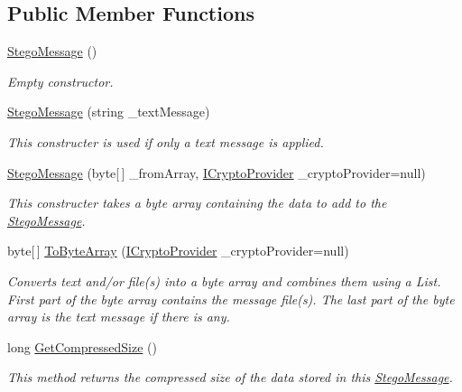 \subsection*{Public Member Functions}
\begin{DoxyCompactItemize}
\item 
\hyperlink{class_stegosaurus_1_1_stego_message_a0c77527382a7b96dcee471eeb6c6d33b}{Stego\+Message} ()
\begin{DoxyCompactList}\small\item\em Empty constructor. \end{DoxyCompactList}\item 
\hyperlink{class_stegosaurus_1_1_stego_message_ab51641b56506698542fd1c1b6aed778e}{Stego\+Message} (string \+\_\+text\+Message)
\begin{DoxyCompactList}\small\item\em This constructer is used if only a text message is applied. \end{DoxyCompactList}\item 
\hyperlink{class_stegosaurus_1_1_stego_message_ae860989f48b4c55af65481fa292fb9b4}{Stego\+Message} (byte\mbox{[}$\,$\mbox{]} \+\_\+from\+Array, \hyperlink{interface_stegosaurus_1_1_cryptography_1_1_i_crypto_provider}{I\+Crypto\+Provider} \+\_\+crypto\+Provider=null)
\begin{DoxyCompactList}\small\item\em This constructer takes a byte array containing the data to add to the \hyperlink{class_stegosaurus_1_1_stego_message}{Stego\+Message}. \end{DoxyCompactList}\item 
byte\mbox{[}$\,$\mbox{]} \hyperlink{class_stegosaurus_1_1_stego_message_abf4c305d1dddbfd3b769d7bbc35bfcf3}{To\+Byte\+Array} (\hyperlink{interface_stegosaurus_1_1_cryptography_1_1_i_crypto_provider}{I\+Crypto\+Provider} \+\_\+crypto\+Provider=null)
\begin{DoxyCompactList}\small\item\em Converts text and/or file(s) into a byte array and combines them using a List. First part of the byte array contains the message file(s). The last part of the byte array is the text message if there is any. \end{DoxyCompactList}\item 
long \hyperlink{class_stegosaurus_1_1_stego_message_a3333bd46cd0c2f04f9a9352c52cfd95d}{Get\+Compressed\+Size} ()
\begin{DoxyCompactList}\small\item\em This method returns the compressed size of the data stored in this \hyperlink{class_stegosaurus_1_1_stego_message}{Stego\+Message}. \end{DoxyCompactList}\end{DoxyCompactItemize}
